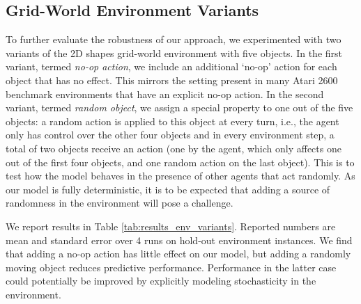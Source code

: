 \documentclass{article} %
\begin{document}
\subsection{Grid-World Environment Variants}
\label{sec:grid-variants}
To further evaluate the robustness of our approach, we experimented with two variants of the 2D shapes grid-world environment with five objects.
%
In the first variant, termed \textit{no-op action}, we include an additional `no-op' action for each object that has no effect. This mirrors the setting present in many Atari 2600 benchmark environments that have an explicit no-op action.
%
In the second variant, termed \textit{random object}, we assign a special property to one out of the five objects: a random action is applied to this object at every turn, i.e., the agent only has control over the other four objects and in every environment step, a total of two objects receive an action (one by the agent, which only affects one out of the first four objects, and one random action on the last object). This is to test how the model behaves in the presence of other agents that act randomly. As our model is fully deterministic, it is to be expected that adding a source of randomness in the environment will pose a challenge.

We report results in Table \ref{tab:results_env_variants}. Reported numbers are mean and standard error over 4 runs on hold-out environment instances. We find that adding a no-op action has little effect on our model, but adding a randomly moving object reduces predictive performance. Performance in the latter case could potentially be improved by explicitly modeling stochasticity in the environment.
\end{document}
